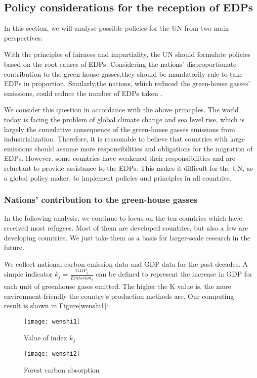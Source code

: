 \documentclass{mcmthesis}
\newcommand{\upcite}[1]{\textsuperscript{\textsuperscript{\cite{#1}}}}
\begin{document}
\subsection{Policy considerations for the reception of EDPs}

In this section, we will analyse possible policies for the UN from two main perspectives: 

With the principles of fairness and impartiality, the UN should formulate policies based on the root causes of EDPs. Considering the nations' disproportionate contribution to the green-house gasses,they should be mandatorily rule to take EDPs in proportion. Similarly,the nations, which reduced the green-house gasses' emissions,  could reduce the number of EDPs taken .

We consider this question in accordance with the above principles. The world today is facing the problem of global climate change and sea level rise, which is largely the cumulative consequence of the green-house gasses emissions from industrialization. Therefore, it is reasonable to believe that countries with large emissions should assume more responsibilities and obligations for the migration of EDPs. However, some countries have weakened their responsibilities and are reluctant to provide assistance to the EDPs. This makes it difficult for the UN, as a global policy maker, to implement policies and principles in all countries.

\subsubsection{Nations' contribution to the green-house gasses} 

\quad\enspace In the following analysis, we continue to focus on the ten countries which have received most refugees. Most of them are developed countries, but also a few are developing countries. We just take them as a basis for larger-scale research in the future. 

We collect national carbon emission data\upcite{4} and GDP data\upcite{6} for the past decades. A simple indicator $ k_j=\frac{{GDP}_{j}}{{Emission}_{j}} $ can be defined to represent the increase in GDP for each unit of greenhouse gases emitted. The higher the K value is, the more environment-friendly the country's production methods are. Our computing result is shown in Figure\ref{wenshi1}: 
\begin{figure}[H]%
	\begin{minipage}[t]{0.5\textwidth}
		\centering
		\texttt{[image: wenshi1]}
		\caption{Value of index $ k_{j} $\label{wenshi1}}
	\end{minipage}
	\qquad
	\begin{minipage}[t]{0.5\textwidth}
		\centering
		\texttt{[image: wenshi2]}
		\caption{Forest carbon absorption\label{wenshi2}}
	\end{minipage}
\end{figure}
\end{document}

